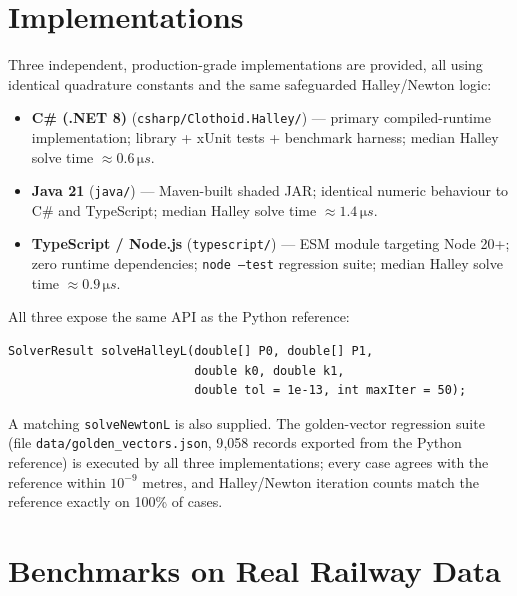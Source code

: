 \documentclass[11pt,a4paper]{article}
\begin{document}
\section{Implementations}

Three independent, production-grade implementations are provided, all using identical quadrature constants and the same safeguarded Halley/Newton logic:

\begin{itemize}
    \item \textbf{C\# (.NET 8)} (\texttt{csharp/Clothoid.Halley/}) --- primary compiled-runtime implementation; library + xUnit tests + benchmark harness; median Halley solve time $\approx 0.6\,\si{\micro s}$.
    \item \textbf{Java 21} (\texttt{java/}) --- Maven-built shaded JAR; identical numeric behaviour to C\# and TypeScript; median Halley solve time $\approx 1.4\,\si{\micro s}$.
    \item \textbf{TypeScript / Node.js} (\texttt{typescript/}) --- ESM module targeting Node 20+; zero runtime dependencies; \texttt{node --test} regression suite; median Halley solve time $\approx 0.9\,\si{\micro s}$.
\end{itemize}

All three expose the same API as the Python reference:
\begin{verbatim}
SolverResult solveHalleyL(double[] P0, double[] P1,
                          double k0, double k1,
                          double tol = 1e-13, int maxIter = 50);
\end{verbatim}
A matching \texttt{solveNewtonL} is also supplied. The golden-vector regression suite (file \texttt{data/\allowbreak golden\_\allowbreak vectors.json}, 9{,}058 records exported from the Python reference) is executed by all three implementations; every case agrees with the reference within $10^{-9}$ metres, and Halley/Newton iteration counts match the reference exactly on 100\% of cases.

\section{Benchmarks on Real Railway Data}
\label{sec:bench}
\end{document}
